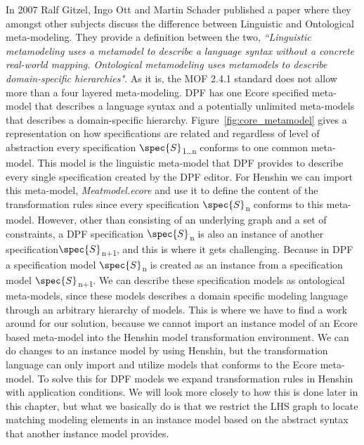 In 2007 Ralf Gitzel, Ingo Ott and Martin Schader published a paper where they
amongst other subjects discuss the difference between Linguistic and
Ontological meta-modeling. They provide a definition between the two, 
\textit{``Linguistic metamodeling uses a metamodel to describe a language syntax
without a concrete real-world mapping. Ontological metamodeling uses metamodels
to describe domain-specific hierarchies"}\cite{gitzel2007ontological}. As it is,
the MOF 2.4.1 standard does not allow more than a four layered meta-modeling.
DPF has one Ecore specified meta-model that describes a language syntax and a
potentially unlimited meta-models that describes a domain-specific hierarchy. 
Figure~\ref{fig:core_metamodel} gives a representation on how specifications
are related and regardless of level of abstraction every specification
$\spec{S}$\textsubscript{1\ldots n} conforms to one common meta-model. This
model is the linguistic meta-model that DPF provides to describe every single
specification created by the DPF editor. For Henshin we can import this
meta-model, \textit{Meatmodel.ecore} and use it to define the content of the
transformation rules since every specification $\spec{S}$\textsubscript{n}
conforms to this meta-model.
However, other than consisting of an underlying graph and a set of constraints,
a DPF specification $\spec{S}$\textsubscript{n} is also an instance of another
specification$\spec{S}$\textsubscript{n+1}, and this is where it gets
challenging. Because in DPF a specification model $\spec{S}$\textsubscript{n}
is created as an instance from a specification model
$\spec{S}$\textsubscript{n+1}. We can describe these specification models as
ontological meta-models, since these models describes a domain specific modeling
language through an arbitrary hierarchy of models. This is where we have to find
a work around for our solution, because we cannot import an instance model of
an Ecore based meta-model into the Henshin model transformation environment. We
can do changes to an instance model by using Henshin, but the transformation
language can only import and utilize models that conforms to the Ecore
meta-model. To solve this for DPF models we expand transformation rules in
Henshin with application conditions. We will look more closely to how this is
done later in this chapter, but what we basically do is that we restrict the
LHS graph to locate matching modeling elements in an instance model based on
the abstract syntax that another instance model provides.


